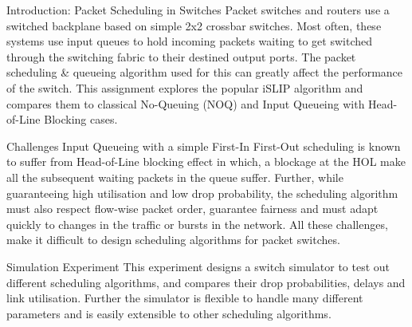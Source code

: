 
\begin{section}{Introduction: Packet Scheduling in Switches}
Packet switches and routers use a switched backplane based on simple 2x2 crossbar switches. Most often, these systems use input queues to hold incoming packets waiting to get switched through the switching fabric to their destined output ports. The packet scheduling \& queueing algorithm used for this can greatly affect the performance of the switch. This assignment explores the popular iSLIP algorithm and compares them to classical No-Queuing (NOQ) and Input Queueing with Head-of-Line Blocking cases.
\end{section}


\begin{section}{Challenges}
 Input Queueing with a simple First-In First-Out scheduling is known to suffer from Head-of-Line blocking effect in which, a blockage at the HOL make all the subsequent waiting packets in the queue suffer. Further, while guaranteeing high utilisation and low drop probability, the scheduling algorithm must also respect flow-wise packet order, guarantee fairness and must adapt quickly to changes in the traffic or bursts in the network. All these challenges, make it difficult to design scheduling algorithms for packet switches. 
\end{section}

\begin{section}{Simulation Experiment}
    This experiment designs a switch simulator to test out different scheduling algorithms, and compares their drop probabilities, delays and link utilisation. Further the simulator is flexible to handle many different parameters and is easily extensible to other scheduling algorithms.
\end{section}

